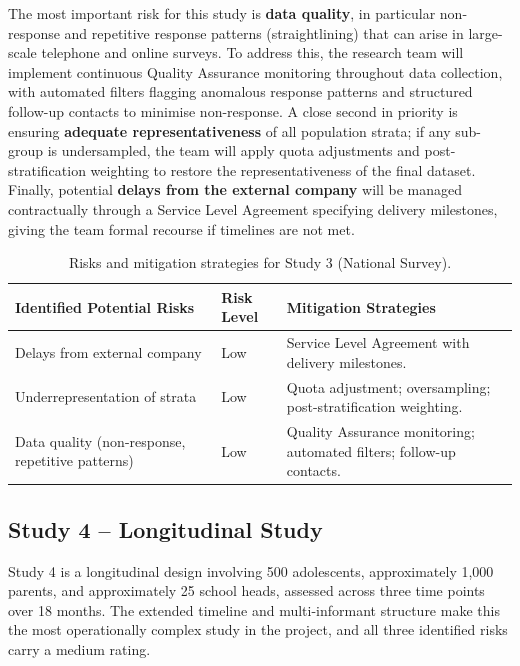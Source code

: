 The most important risk for this study is \textbf{data quality}, in particular non-response and repetitive response patterns (straightlining) that can arise in large-scale telephone and online surveys. To address this, the research team will implement continuous Quality Assurance monitoring throughout data collection, with automated filters flagging anomalous response patterns and structured follow-up contacts to minimise non-response. A close second in priority is ensuring \textbf{adequate representativeness} of all population strata; if any sub-group is undersampled, the team will apply quota adjustments and post-stratification weighting to restore the representativeness of the final dataset. Finally, potential \textbf{delays from the external company} will be managed contractually through a Service Level Agreement specifying delivery milestones, giving the team formal recourse if timelines are not met.

\vspace{0.5cm}

\begin{table}[h!]
\centering
\caption{Risks and mitigation strategies for Study 3 (National Survey).}
\begin{tabular}{|P{5.2cm}|P{2.0cm}|P{7.1cm}|}
\hline
{}
\textbf{Identified Potential Risks} & \textbf{Risk Level} & \textbf{Mitigation Strategies} \\
\hline
Delays from external company
  & Low
  & Service Level Agreement with delivery milestones. \\
\hline
Underrepresentation of strata
  & Low
  & Quota adjustment; oversampling; post-stratification weighting. \\
\hline
Data quality (non-response, repetitive patterns)
  & Low
  & Quality Assurance monitoring; automated filters; follow-up contacts. \\
\hline
\end{tabular}
\end{table}

\subsection*{Study 4 -- Longitudinal Study}

Study 4 is a longitudinal design involving 500 adolescents, approximately 1{,}000 parents, and approximately 25 school heads, assessed across three time points over 18 months. The extended timeline and multi-informant structure make this the most operationally complex study in the project, and all three identified risks carry a medium rating.

